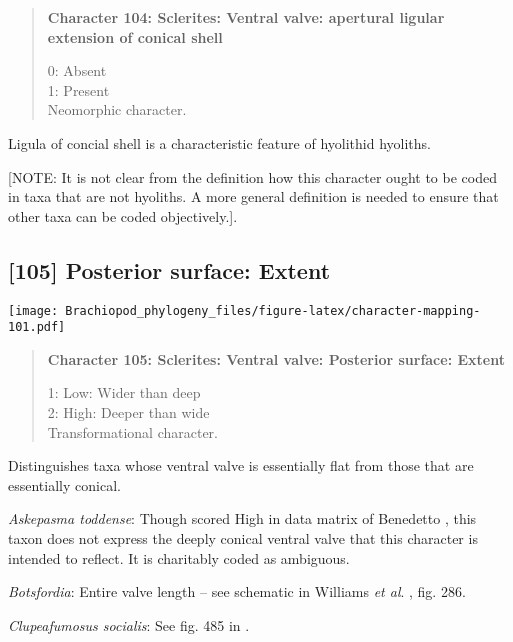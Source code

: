 \documentclass[openany]{book}
\theoremstyle{definition}
\theoremstyle{definition}
\theoremstyle{definition}
\theoremstyle{remark}
\begin{document}
\begin{quote}
\textbf{Character 104: Sclerites: Ventral valve: apertural ligular
extension of conical shell}

0: Absent\\
1: Present\\
Neomorphic character.
\end{quote}

Ligula of concial shell is a characteristic feature of hyolithid
hyoliths.

{[}NOTE: It is not clear from the definition how this character ought to
be coded in taxa that are not hyoliths. A more general definition is
needed to ensure that other taxa can be coded objectively.{]}.

\subsection*{{[}105{]} Posterior surface:
Extent}\label{posterior-surface-extent}

\texttt{[image: Brachiopod\_phylogeny\_files/figure-latex/character-mapping-101.pdf]}

\begin{quote}
\textbf{Character 105: Sclerites: Ventral valve: Posterior surface:
Extent}

1: Low: Wider than deep\\
2: High: Deeper than wide\\
Transformational character.
\end{quote}

Distinguishes taxa whose ventral valve is essentially flat from those
that are essentially conical.

\hypertarget{Askepasma_toddense-coding-105}{}
\emph{Askepasma toddense}: Though scored High in data matrix of
Benedetto \citeyearpar{Benedetto2009iChaniella}, this taxon
\citep[see][fig. 508]{Williams2000LinguliformeaCraniiformea} does not
express the deeply conical ventral valve that this character is intended
to reflect. It is charitably coded as ambiguous.

\hypertarget{Botsfordia-coding-105}{}
\emph{Botsfordia}: Entire valve length -- see schematic in Williams
\emph{et al}. \citeyearpar{Williams1997Introduction}, fig. 286.

\hypertarget{Clupeafumosus_socialis-coding-105}{}
\emph{Clupeafumosus socialis}: See fig. 485 in
\citet{Williams2000LinguliformeaCraniiformea}.
\end{document}
